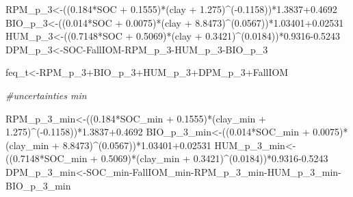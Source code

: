 \documentclass[
  10pt,
  b5paper,
]{book}
\newenvironment{Shaded}{\begin{snugshade}}{\end{snugshade}}
\newcommand{\CommentTok}[1]{\textcolor[rgb]{0.56,0.35,0.01}{\textit{#1}}}
\newcommand{\FloatTok}[1]{\textcolor[rgb]{0.00,0.00,0.81}{#1}}
\newcommand{\NormalTok}[1]{#1}
\newcommand{\OtherTok}[1]{\textcolor[rgb]{0.56,0.35,0.01}{#1}}
\newcommand{\SpecialCharTok}[1]{\textcolor[rgb]{0.00,0.00,0.00}{#1}}
\begin{document}
\begin{Shaded}
\begin{Highlighting}[]
\NormalTok{RPM\_p\_3}\OtherTok{\textless{}{-}}\NormalTok{((}\FloatTok{0.184}\SpecialCharTok{*}\NormalTok{SOC }\SpecialCharTok{+} \FloatTok{0.1555}\NormalTok{)}\SpecialCharTok{*}\NormalTok{(clay }\SpecialCharTok{+} \FloatTok{1.275}\NormalTok{)}\SpecialCharTok{\^{}}\NormalTok{(}\SpecialCharTok{{-}}\FloatTok{0.1158}\NormalTok{))}\SpecialCharTok{*}\FloatTok{1.3837+0.4692}
\NormalTok{BIO\_p\_3}\OtherTok{\textless{}{-}}\NormalTok{((}\FloatTok{0.014}\SpecialCharTok{*}\NormalTok{SOC }\SpecialCharTok{+} \FloatTok{0.0075}\NormalTok{)}\SpecialCharTok{*}\NormalTok{(clay }\SpecialCharTok{+} \FloatTok{8.8473}\NormalTok{)}\SpecialCharTok{\^{}}\NormalTok{(}\FloatTok{0.0567}\NormalTok{))}\SpecialCharTok{*}\FloatTok{1.03401+0.02531}
\NormalTok{HUM\_p\_3}\OtherTok{\textless{}{-}}\NormalTok{((}\FloatTok{0.7148}\SpecialCharTok{*}\NormalTok{SOC }\SpecialCharTok{+} \FloatTok{0.5069}\NormalTok{)}\SpecialCharTok{*}\NormalTok{(clay }\SpecialCharTok{+} \FloatTok{0.3421}\NormalTok{)}\SpecialCharTok{\^{}}\NormalTok{(}\FloatTok{0.0184}\NormalTok{))}\SpecialCharTok{*}\FloatTok{0.9316{-}0.5243}
\NormalTok{DPM\_p\_3}\OtherTok{\textless{}{-}}\NormalTok{SOC}\SpecialCharTok{{-}}\NormalTok{FallIOM}\SpecialCharTok{{-}}\NormalTok{RPM\_p\_3}\SpecialCharTok{{-}}\NormalTok{HUM\_p\_3}\SpecialCharTok{{-}}\NormalTok{BIO\_p\_3}

\NormalTok{feq\_t}\OtherTok{\textless{}{-}}\NormalTok{RPM\_p\_3}\SpecialCharTok{+}\NormalTok{BIO\_p\_3}\SpecialCharTok{+}\NormalTok{HUM\_p\_3}\SpecialCharTok{+}\NormalTok{DPM\_p\_3}\SpecialCharTok{+}\NormalTok{FallIOM}

\CommentTok{\#uncertainties min}

\NormalTok{RPM\_p\_3\_min}\OtherTok{\textless{}{-}}\NormalTok{((}\FloatTok{0.184}\SpecialCharTok{*}\NormalTok{SOC\_min }\SpecialCharTok{+} \FloatTok{0.1555}\NormalTok{)}\SpecialCharTok{*}\NormalTok{(clay\_min }\SpecialCharTok{+} \FloatTok{1.275}\NormalTok{)}\SpecialCharTok{\^{}}\NormalTok{(}\SpecialCharTok{{-}}\FloatTok{0.1158}\NormalTok{))}\SpecialCharTok{*}\FloatTok{1.3837+0.4692}
\NormalTok{BIO\_p\_3\_min}\OtherTok{\textless{}{-}}\NormalTok{((}\FloatTok{0.014}\SpecialCharTok{*}\NormalTok{SOC\_min }\SpecialCharTok{+} \FloatTok{0.0075}\NormalTok{)}\SpecialCharTok{*}\NormalTok{(clay\_min }\SpecialCharTok{+} \FloatTok{8.8473}\NormalTok{)}\SpecialCharTok{\^{}}\NormalTok{(}\FloatTok{0.0567}\NormalTok{))}\SpecialCharTok{*}\FloatTok{1.03401+0.02531}
\NormalTok{HUM\_p\_3\_min}\OtherTok{\textless{}{-}}\NormalTok{((}\FloatTok{0.7148}\SpecialCharTok{*}\NormalTok{SOC\_min }\SpecialCharTok{+} \FloatTok{0.5069}\NormalTok{)}\SpecialCharTok{*}\NormalTok{(clay\_min }\SpecialCharTok{+} \FloatTok{0.3421}\NormalTok{)}\SpecialCharTok{\^{}}\NormalTok{(}\FloatTok{0.0184}\NormalTok{))}\SpecialCharTok{*}\FloatTok{0.9316{-}0.5243}
\NormalTok{DPM\_p\_3\_min}\OtherTok{\textless{}{-}}\NormalTok{SOC\_min}\SpecialCharTok{{-}}\NormalTok{FallIOM\_min}\SpecialCharTok{{-}}\NormalTok{RPM\_p\_3\_min}\SpecialCharTok{{-}}\NormalTok{HUM\_p\_3\_min}\SpecialCharTok{{-}}\NormalTok{BIO\_p\_3\_min}


\end{Highlighting}
\end{Shaded}
\end{document}
